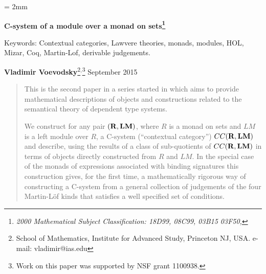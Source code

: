 \documentclass[11pt]{article}
\newcommand{\rr}{{\bf R}}
\newcommand{\lm}{{\bf LM}}
\begin{document}
%
\parskip = 2mm
\begin{center}
{\bf\Large C-system of a module over a monad on sets\footnote{\em 2000 Mathematical Subject Classification: 
%
18D99, %
08C99, %
03B15 %
03F50, %
%
}}

Keywords: Contextual categories, Lawvere theories, monads, modules, HOL, Mizar, Coq, Martin-Lof, derivable judgements. 

\vspace{3mm}

{\large\bf Vladimir Voevodsky}\footnote{School of Mathematics, Institute for Advanced Study,
Princeton NJ, USA. e-mail: vladimir@ias.edu}$^,$\footnote{Work on this paper was supported by NSF grant 1100938.}
\vspace {3mm}
{September 2015}  
\end{center}

\begin{abstract}
This is the second paper in a series started in \cite{Csubsystems} which aims to provide mathematical descriptions of objects and constructions related to the semantical theory of dependent type systems. 

We construct for any pair $(\rr,\lm)$, where $R$ is a monad on sets and $LM$ is a left module over $R$, a C-system (``contextual category'') $CC(\rr,\lm)$ and describe, using the results of \cite{Csubsystems} a class of sub-quotients of $CC(\rr,\lm)$ in terms of objects directly constructed from $R$ and $LM$. In the special case of the monads of expressions associated with  binding signatures this construction gives, for the first time, a mathematically rigorous way of constructing a C-system from a general collection of judgements of the four Martin-L\"{o}f kinds that satisfies a well specified set of conditions. 
\end{abstract}



\end{document}

